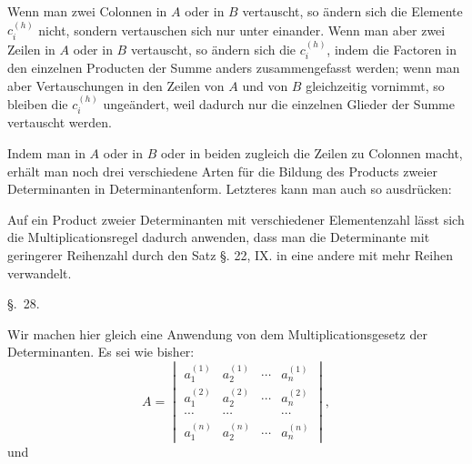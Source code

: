 
Wenn man zwei Colonnen in $A$ oder in $B$ vertauscht, so ändern sich die Elemente $c_i^{(h)}$ nicht, sondern vertauschen sich nur unter einander. Wenn man aber zwei Zeilen in $A$ oder in $B$ vertauscht, so ändern sich die $c_i^{(h)}$, indem die Factoren in den einzelnen Producten der Summe anders zusammengefasst werden; wenn man aber  Vertauschungen in den Zeilen von $A$ und von $B$ gleichzeitig vornimmt, so bleiben die $c_i^{(h)}$ ungeändert, weil dadurch nur die einzelnen Glieder der Summe vertauscht werden.

Indem man in $A$ oder in $B$ oder in beiden zugleich die Zeilen zu Colonnen macht, erhält man noch drei verschiedene Arten für die Bildung des Products zweier Determinanten in Determinantenform. Letzteres kann man auch so ausdrücken: 

Auf ein Product zweier Determinanten mit verschiedener Elementenzahl lässt sich die Multiplicationsregel dadurch anwenden, dass man die Determinante mit geringerer Reihenzahl durch den Satz §. 22, IX. in eine andere mit mehr Reihen verwandelt.

\begin{center}
{\large \S.\ 28.}

\vspace{0.5em}
{\large{}}
\end{center}

Wir machen hier gleich eine Anwendung von dem Multiplicationsgesetz der Determinanten. Es sei wie bisher:
\[
A=\begin{vmatrix}
 a_1^{(1)}&a_2^{(1)}&\cdots&a_n^{(1)}\\
 a_1^{(2)}&a_2^{(2)}&\cdots&a_n^{(2)}\\
 \cdots&\cdots&&\cdots\\
 a_1^{(n)}&a_2^{(n)}&\cdots&a_n^{(n)}
\end{vmatrix},\tag{1}
\]
und
